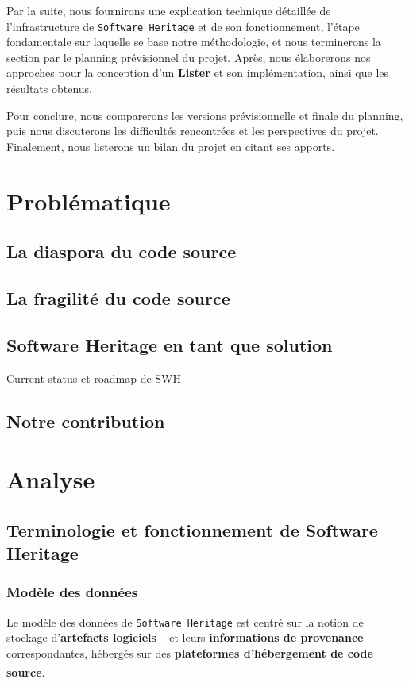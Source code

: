 \documentclass[12pt,a4paper]{report}
\theoremstyle{definition}
\begin{document}
Par la suite, nous fournirons une explication technique détaillée de l'infrastructure de \texttt{Software Heritage} et de son fonctionnement, l'étape fondamentale sur laquelle se base notre méthodologie, et nous terminerons la section par le planning prévisionnel du projet. Après, nous élaborerons nos approches pour la conception d'un \textbf{Lister} et son implémentation, ainsi que les résultats obtenus.

Pour conclure, nous comparerons les versions prévisionnelle et finale du planning, puis nous discuterons les difficultés rencontrées et les perspectives du projet. Finalement, nous listerons un bilan du projet en citant ses apports.

\chapter{Problématique}
\section{La diaspora du code source}

\section{La fragilité du code source}

\section{Software Heritage en tant que solution}
	Current status et roadmap de SWH

\section{Notre contribution}

\chapter{Analyse}
\section{Terminologie et fonctionnement de Software Heritage}
\subsection{Modèle des données}
Le modèle des données de \texttt{Software Heritage} est centré sur la notion de stockage d'\og \textbf{artefacts logiciels} \fg~ et leurs \textbf{informations de provenance} correspondantes, hébergés sur des \textbf{plateformes d'hébergement de code source}\textsuperscript{\citep{dicosmoWhyAndHow}}.
\end{document}
